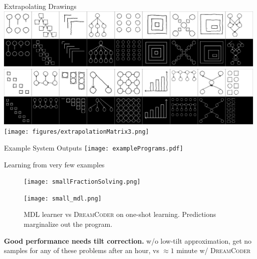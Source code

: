 \documentclass[final]{beamer}
\newlength{\onecolwid}
\newlength{\twocolwid}
\newcommand{\theSystem}{\textsc{DreamCoder}}
\begin{document}
\begin{frame}[t]
\begin{columns}[t]
\begin{column}{\twocolwid}
\begin{columns}[t,totalwidth=\twocolwid]
\begin{column}{\onecolwid}
\begin{block}{Extrapolating Drawings}
      \includegraphics[width = \textwidth]{figures/extrapolationMatrix1.png}\\
  \includegraphics[width = \textwidth]{figures/extrapolationMatrix2.png}\\
  \texttt{[image: figures/extrapolationMatrix3.png]}  \\
\end{block}

  \begin{block}{Example System Outputs}
\texttt{[image: examplePrograms.pdf]} 
\end{block}

\begin{block}{Learning from very few examples}
\begin{figure}[h]\centering
  \begin{minipage}{0.45\textwidth}\centering
    \texttt{[image: smallFractionSolving.png]}
  \caption{Results averaged across 19 problems. Solid: \theSystem{} . Dashed: enumerating 100 programs. Dotted: MDL.}\label{flashPerformance}        \end{minipage}%
\hspace{0.025\textwidth}\begin{minipage}{0.45\textwidth}\centering
    \texttt{[image: small\_mdl.png]}
    \caption{MDL learner vs \theSystem{} on one-shot learning. Predictions marginalize out the program.}\label{mdl}
  \end{minipage}
\end{figure}


\textbf{Good performance needs tilt correction.} w/o low-tilt approximation, get no samples for any of these problems after an hour, vs $\approx 1$ minute w/ \theSystem




\end{block}
\end{column}
\end{columns}
\end{column}
\end{columns}
\end{frame}
\end{document}
